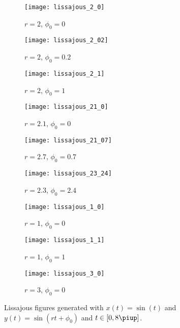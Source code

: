 \documentclass[11pt, english, fleqn, DIV=15, headinclude, BCOR=2cm]{scrreprt}
\begin{document}
\begin{figure}
    \centering
    \begin{subfigure}[c]{0.3\linewidth}
        \centering
        \texttt{[image: lissajous\_2\_0]}
        \caption{%
            $r = 2$, $\phi_0 = 0$
            }
    \end{subfigure}
    \hfill
    \begin{subfigure}[c]{0.3\linewidth}
        \centering
        \texttt{[image: lissajous\_2\_02]}
        \caption{%
            $r = 2$, $\phi_0 = 0.2$
            }
    \end{subfigure}
    \hfill
    \begin{subfigure}[c]{0.3\linewidth}
        \centering
        \texttt{[image: lissajous\_2\_1]}
        \caption{%
            $r = 2$, $\phi_0 = 1$
            }
    \end{subfigure}

    \vspace{2ex}

    \begin{subfigure}[c]{0.3\linewidth}
        \centering
        \texttt{[image: lissajous\_21\_0]}
        \caption{%
            $r = 2.1$, $\phi_0 = 0$
            }
    \end{subfigure}
    \hfill
    \begin{subfigure}[c]{0.3\linewidth}
        \centering
        \texttt{[image: lissajous\_21\_07]}
        \caption{%
            $r = 2.7$, $\phi_0 = 0.7$
            }
    \end{subfigure}
    \hfill
    \begin{subfigure}[c]{0.3\linewidth}
        \centering
        \texttt{[image: lissajous\_23\_24]}
        \caption{%
            $r = 2.3$, $\phi_0 = 2.4$
            }
    \end{subfigure}

    \vspace{2ex}

    \begin{subfigure}[c]{0.3\linewidth}
        \centering
        \texttt{[image: lissajous\_1\_0]}
        \caption{%
            $r = 1$, $\phi_0 = 0$
            }
    \end{subfigure}
    \hfill
    \begin{subfigure}[c]{0.3\linewidth}
        \centering
        \texttt{[image: lissajous\_1\_1]}
        \caption{%
            $r = 1$, $\phi_0 = 1$
            }
    \end{subfigure}
    \hfill
    \begin{subfigure}[c]{0.3\linewidth}
        \centering
        \texttt{[image: lissajous\_3\_0]}
        \caption{%
            $r = 3$, $\phi_0 = 0$
            }
    \end{subfigure}
    \caption{%
        Lissajous figures generated with $x(t) = \sin(t)$ and $y(t) = \sin(rt +
        \phi_0)$ and $t \in [0, 8 \piup]$.
        }
    \label{fig:lissajous-generated}
\end{figure}
\end{document}
